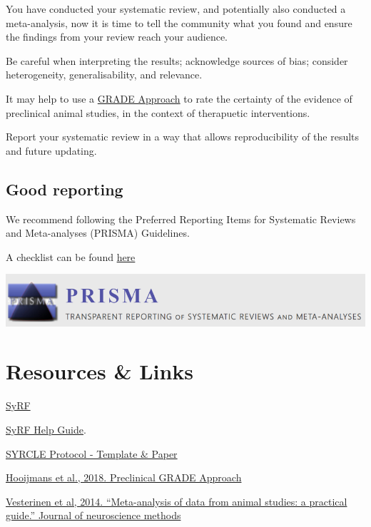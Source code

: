 \documentclass[
]{book}
\begin{document}
You have conducted your systematic review, and potentially also conducted a meta-analysis, now it is time to tell the community what you found and ensure the findings from your review reach your audience.

Be careful when interpreting the results; acknowledge sources of bias; consider heterogeneity, generalisability, and relevance.

It may help to use a \href{https://journals.plos.org/plosone/article?id=10.1371/journal.pone.0187271}{GRADE Approach} to rate the certainty of the evidence of preclinical animal studies, in the context of therapuetic interventions.

Report your systematic review in a way that allows reproducibility of the results and future updating.

\hypertarget{good-reporting}{%
\section{Good reporting}\label{good-reporting}}

We recommend following the Preferred Reporting Items for Systematic Reviews and Meta-analyses (PRISMA) Guidelines.

A checklist can be found \href{http://www.prisma-statement.org/PRISMAStatement/Checklist}{here}

\includegraphics{figs/PRISMA.png}

\hypertarget{resources-links}{%
\chapter{Resources \& Links}\label{resources-links}}

\href{https://syrf.org.uk}{SyRF}

\href{https://assets.syrf.org.uk/guides/SyRF_User_Guide.pdf}{SyRF Help Guide}.

\href{https://onlinelibrary.wiley.com/doi/epdf/10.1002/ebm2.7}{SYRCLE Protocol - Template \& Paper}

\href{https://journals.plos.org/plosone/article?id=10.1371/journal.pone.0187271}{Hooijmans et al., 2018. Preclinical GRADE Approach}

\href{https://doi.org/10.1016/j.jneumeth.2013.09.010}{Vesterinen et al, 2014. ``Meta-analysis of data from animal studies: a practical guide.'' Journal of neuroscience methods}
\end{document}
